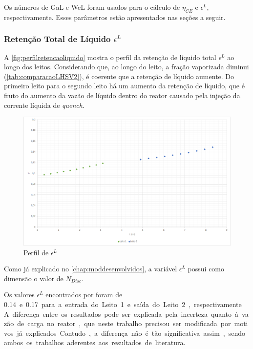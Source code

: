 Os números de GaL e WeL foram usados para o cálculo de $\eta_{CE}$ e
$\epsilon^{L}$, respectivamente. Esses parâmetros estão apresentados nas seções
a seguir.

\subsubsection{Retenção Total de Líquido $\epsilon^{L}$}
\label{retencaototaldeliquido}

A \autoref{fig:perfilretencaoliquido} mostra o perfil da retenção de líquido
total $\epsilon^{L}$ ao longo dos leitos. Considerando que, ao longo do leito, a fração vaporizada diminui
(\autoref{tab:comparacaoLHSV2}), é coerente que a retenção de líquido aumente.
Do primeiro leito para o segundo leito há um aumento da retenção de líquido, que
é fruto do aumento da vazão de líquido dentro do reator causado pela injeção da
corrente líquida de \emph{quench}.

\begin{figure}[htb]
\centering
\includegraphics[scale=0.4]{images/Chap4/perfilretencaoliquido.png}
\caption{Perfil de $\epsilon^{L}$}
\label{fig:perfilretencaoliquido}
\end{figure}

Como já explicado no \autoref{chap:moddesenvolvidos}, a variável $\epsilon^{L}$
possui como dimensão o valor de $N_{Disc}$.

Os valores $\epsilon^{L}$ encontrados por  foram de
\SI{0,14} e \SI{0,17} para a entrada do Leito 1 e saída do Leito 2,
respectivamente. A diferença entre os resultados pode ser explicada pela
incerteza quanto à vazão de carga no reator, que neste trabalho precisou ser
modificada por motivos já explicados. Contudo, a diferença não é tão
significativa assim, sendo ambos os trabalhos aderentes aos resultados de
literatura.

